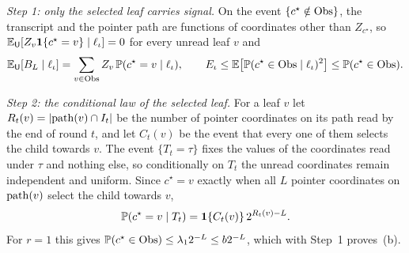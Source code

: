 \emph{Step 1: only the selected leaf carries signal.}
On the event $\{c^\star\notin{\rm Obs}\}$, the transcript and the pointer
path are functions of coordinates other than $Z_{c^\star}$, so
$\mathbb{E}_\mathsf U[Z_v\mathbf 1\{c^\star=v\}\mid\ell_\iota]=0$ for every unread leaf $v$ and
\[
 \mathbb{E}_\mathsf U[B_L\mid\ell_\iota]=\sum_{v\in{\rm Obs}}Z_v\,\mathbb P(c^\star=v\mid\ell_\iota),
 \qquad
 E_\iota\le\mathbb{E}\big[\mathbb P(c^\star\in{\rm Obs}\mid\ell_\iota)^2\big]\le\mathbb P(c^\star\in{\rm Obs}).
\]

\emph{Step 2: the conditional law of the selected leaf.}
For a leaf $v$ let $R_t(v)=|{\rm path}(v)\cap I_t|$ be the number of pointer
coordinates on its path read by the end of round $t$, and let $C_t(v)$ be the
event that every one of them selects the child towards $v$. The event
$\{T_t=\tau\}$ fixes the values of the coordinates read under $\tau$ and
nothing else, so conditionally on $T_t$ the unread coordinates remain
independent and uniform. Since $c^\star=v$ exactly when all $L$ pointer
coordinates on ${\rm path}(v)$ select the child towards $v$,
\begin{equation}
 \mathbb P(c^\star=v\mid T_t)=\mathbf 1\{C_t(v)\}\,2^{R_t(v)-L}.\label{eq:leaflaw}
\end{equation}
For $r=1$ this gives $\mathbb P(c^\star\in{\rm Obs})\le\lambda_1 2^{-L}\le b2^{-L}$,
which with Step~1 proves~(b).

